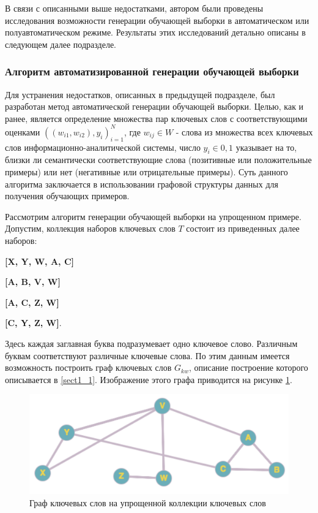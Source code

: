 В связи с описанными выше недостатками, автором были проведены исследования возможности генерации обучающей выборки в автоматическом или полуавтоматическом режиме. Результаты этих исследований детально описаны в следующем далее подразделе.

\subsubsection{Алгоритм автоматизированной генерации обучающей выборки}
Для устранения недостатков, описанных в предыдущей подразделе, был разработан метод автоматической генерации обучающей выборки. Целью, как и ранее, является определение множества пар ключевых слов с соответствующими оценками  $((w_{i1}, w_{i2}), y_i)_{i=1}^{N}$, где $w_{ij} \in W$ - слова из множества всех ключевых слов информационно-аналитической системы, число $y_i \in {0, 1}$ указывает на то, близки ли семантически соответствующие слова (позитивные или положительные примеры) или нет (негативные или отрицательные примеры). Суть данного алгоритма заключается в использовании графовой структуры данных для получения обучающих примеров.

Рассмотрим алгоритм генерации обучающей выборки на упрощенном примере. Допустим, коллекция наборов ключевых слов $T$ состоит из приведенных далее наборов:

\textbf{[X, Y, W, A, C]}\

\textbf{[A, B, V, W]}\

\textbf{[A, C, Z, W]}\

\textbf{[C, Y, Z, W]}.\

Здесь каждая заглавная буква подразумевает одно ключевое слово. Различным буквам соответствуют различные ключевые слова. По этим данным имеется возможность построить граф ключевых слов $G_{kw}$, описание построение которого описывается в \ref{sect1_1}. Изображение этого графа приводится на рисунке \ref{img:art_train_graph}. 

\begin{figure}[ht]
  \begin{minipage}[ht]{1.0\linewidth}\centering
    \includegraphics[width=0.7\linewidth]{Dissertation/pics/art_train_graph}
    \caption{Граф ключевых слов на упрощенной коллекции ключевых слов}
    \label{img:art_train_graph}
  \end{minipage}
\end{figure}


